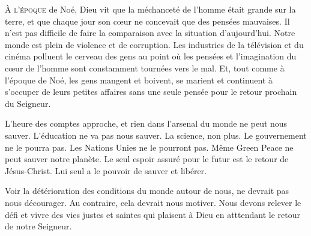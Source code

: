 


\lettrine{À}{ l'époque} de Noé, Dieu vit que la méchanceté de l'homme
 était grande sur la terre, et que chaque jour son c\oe{}ur ne concevait
 que des pensées mauvaises. Il n'est pas difficile de faire
 la comparaison avec la situation d'aujourd'hui. Notre monde est plein
 de violence et de corruption. Les industries de la télévision
 et du cinéma polluent le cerveau des gens au point où les pensées
 et l'imagination du c\oe{}ur de l'homme sont constamment
 tournées vers le mal. Et, tout comme à l'époque de Noé,
 les gens mangent et boivent, se marient et continuent
 à s'occuper de leurs petites affaires sans une seule pensée
 pour le retour prochain du Seigneur. 


L'heure des comptes approche, et rien dans l'arsenal du monde
 ne peut nous sauver. L'éducation ne va pas nous sauver.
 La science, non plus. Le gouvernement ne le pourra pas.
 Les Nations Unies ne le pourront pas. Même Green Peace
 ne peut sauver notre planète. Le seul espoir assuré pour le futur
 est le retour de Jésus-Christ.
 Lui seul a le pouvoir de sauver et libérer. 

Voir la détérioration des conditions du monde autour de nous,
 ne devrait pas nous décourager. Au contraire, cela devrait nous motiver.
 Nous devons relever le défi et vivre des vies justes et saintes
 qui plaisent à Dieu en atttendant le retour de notre Seigneur. 

\dvrule






